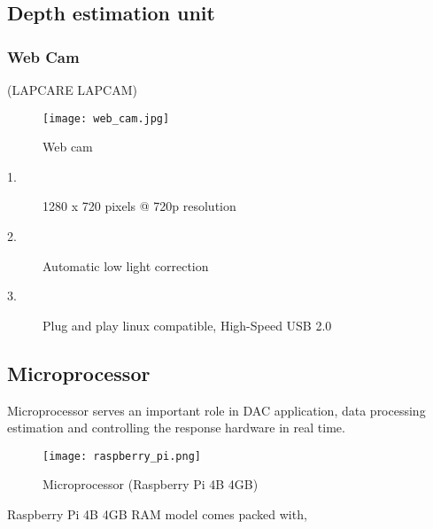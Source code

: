 \documentclass[../../../patent_v1.tex]{subfiles}
\begin{document}
\subsection{Depth estimation unit}

\subsubsection{Web Cam}

(LAPCARE LAPCAM)

\begin{figure}[ht]
    \centering
    \texttt{[image: web\_cam.jpg]}
    \caption{Web cam}
\end{figure}

\FloatBarrier

\begin{description}
    \item[1.]1280 x 720 pixels @ 720p resolution
    \item[2.]Automatic low light correction
    \item[3.]Plug and play linux compatible, High-Speed USB 2.0   
\end{description}


\subsection{Microprocessor}

Microprocessor serves an important role in DAC application, data processing estimation 
and controlling the response hardware in real time.

\begin{figure}[ht]
    \texttt{[image: raspberry\_pi.png]}
    \caption{Microprocessor (Raspberry Pi 4B 4GB)}
\end{figure}

\FloatBarrier

Raspberry Pi 4B 4GB RAM model comes packed with, 
\end{document}
